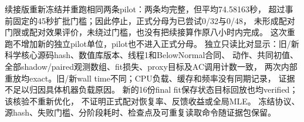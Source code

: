 续接版重新冻结并重跑相同两条pilot：两条均完整，但平均74.58163秒，
超过事前固定的45秒扩批门槛；因此停止，正式分母为已尝试0/32与0/48，
未形成配对门限或配对效果评价，未绕过门槛，也没有把续接算作原八小时内完成。
这次重跑不增加新的独立pilot单位，pilot也不进入正式分母。
独立只读比对显示：旧/新科学核心源码hash、数值库版本、线程1和BelowNormal合同、
动作、共同初值、全部shadow/paired观测数组、fit损失、proxy目标及AC调用计数一致，
两次内部重放均exact。旧/新wall time不同；CPU负载、缓存和频率没有同期记录，
证据不足以归因具体机器负载原因。
新的16份final fit保存状态目标回放也均verified；该核验不重新优化，
不证明正式配对恢复率、反馈收益或全局MLE。
冻结协议、源hash、失败门槛、分阶段耗时、检查点及可重复读取命令随证据包保留。
